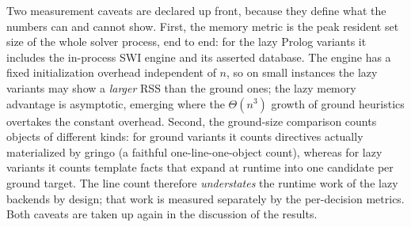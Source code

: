 Two measurement caveats are declared up front, because they define what the numbers can and cannot show. First, the memory metric is the peak resident set size of the whole solver process, end to end: for the lazy Prolog variants it includes the in-process SWI engine and its asserted database. The engine has a fixed initialization overhead independent of $n$, so on small instances the lazy variants may show a \emph{larger} RSS than the ground ones; the lazy memory advantage is asymptotic, emerging where the $\Theta(n^3)$ growth of ground heuristics overtakes the constant overhead. Second, the ground-size comparison counts objects of different kinds: for ground variants it counts directives actually materialized by gringo (a faithful one-line-one-object count), whereas for lazy variants it counts template facts that expand at runtime into one candidate per ground target. The line count therefore \emph{understates} the runtime work of the lazy backends by design; that work is measured separately by the per-decision metrics. Both caveats are taken up again in the discussion of the results.
